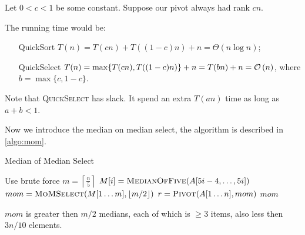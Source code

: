 Let $0<c<1$ be some constant. Suppose our pivot always had rank $cn$.

The running time would be:
\begin{itemize}
    \item[QuickSort] $T(n) = T(cn) + T((1-c)n) + n = \Theta(n \log n)$;
    \item[QuickSelect] $T(n) = \max\{T(cn), T((1-c)n)\} + n = T(bn) + n = \mathcal{O}\left(n\right)$, where $b = \max\{c, 1-c\}$.
\end{itemize}

Note that \textsc{QuickSelect} has slack. It spend an extra $T(an)$ time as long as $a+b<1$.

Now we introduce the median on median select, the algorithm is described in \cref{algo:mom}.

\begin{algorithm}[H]
    \caption{Median of Median Select}\label{algo:mom}
    \begin{algorithmic}[1]
                \State Use brute force
            \Else
                \State $\displaystyle m = \left\lceil\frac{n}{5}\right\rceil$
                    \State $M[i] = \textsc{MedianOfFive} (A[5i-4, \ldots ,5i])$
                \EndFor
                \State $mom = \textsc{MoMSelect} (M[1 \ldots m], \lfloor m/2 \rfloor)$
                \State $r = \textsc{Pivot} (A[1 \ldots n], mom)$
                    \Return {}
                    \Return {}
                \Else
                    \Return $mom$
                \EndIf
            \EndIf
        \EndProcedure
    \end{algorithmic}
\end{algorithm}

\observation
$mom$ is greater then $m/2$ medians, each of which is $\geq 3$ items, also less then $3n/10$ elements.
